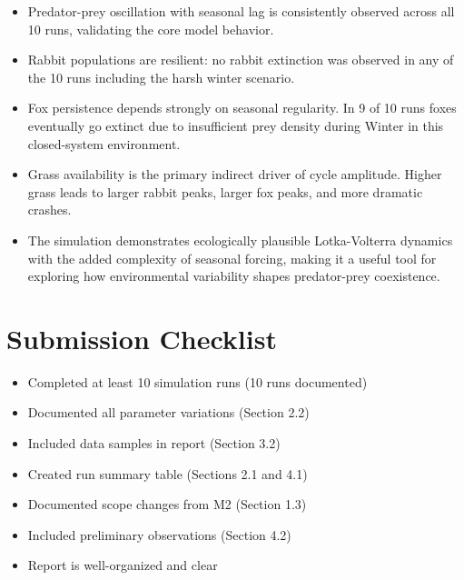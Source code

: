 \documentclass[12pt]{article}
\begin{document}
\begin{itemize}
    \item Predator-prey oscillation with seasonal lag is consistently observed
    across all 10 runs, validating the core model behavior.

    \item Rabbit populations are resilient: no rabbit extinction was observed in
    any of the 10 runs including the harsh winter scenario.

    \item Fox persistence depends strongly on seasonal regularity. In 9 of 10
    runs foxes eventually go extinct due to insufficient prey density during
    Winter in this closed-system environment.

    \item Grass availability is the primary indirect driver of cycle amplitude.
    Higher grass leads to larger rabbit peaks, larger fox peaks, and more
    dramatic crashes.

    \item The simulation demonstrates ecologically plausible Lotka-Volterra
    dynamics with the added complexity of seasonal forcing, making it a useful
    tool for exploring how environmental variability shapes predator-prey
    coexistence.
\end{itemize}

\section*{Submission Checklist}

\begin{itemize}
    \item[$\checkmark$] Completed at least 10 simulation runs (10 runs documented)
    \item[$\checkmark$] Documented all parameter variations (Section 2.2)
    \item[$\checkmark$] Included data samples in report (Section 3.2)
    \item[$\checkmark$] Created run summary table (Sections 2.1 and 4.1)
    \item[$\checkmark$] Documented scope changes from M2 (Section 1.3)
    \item[$\checkmark$] Included preliminary observations (Section 4.2)
    \item[$\checkmark$] Report is well-organized and clear
\end{itemize}
\end{document}
